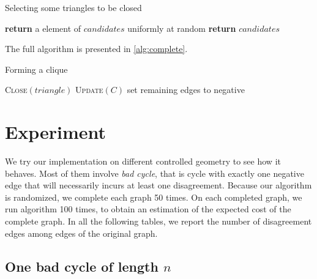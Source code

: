 \begin{algorithm}
	\caption{Selecting some triangles to be closed \label{alg:pick}}
	\begin{algorithmic}[0]
			\Else
			\EndIf
				\State \textbf{return} a element of $candidates$ uniformly at
				random 
			\Else
				\State \textbf{return} $candidates$
			\EndIf
		\EndFunction
	\end{algorithmic}
\end{algorithm}


The full algorithm is presented in \autoref{alg:complete}.

\begin{algorithm}
	\caption{Forming a clique \label{alg:complete}}
	\begin{algorithmic}[0]
			\EndIf
			\EndFor
					\State \textsc{Close}$(triangle)$
				\EndFor
				\State \textsc{Update}$(C)$
			\EndWhile
			\State set remaining edges to negative
		\EndFunction
	\end{algorithmic}
\end{algorithm}

\section{Experiment}

We try our implementation on different controlled geometry to see how it
behaves. Most of them involve \emph{bad cycle}, that is cycle with exactly one
negative edge that will necessarily incurs at least one disagreement.  Because
our algorithm is randomized, we complete each graph 50 times.  On each
completed graph, we run \ccp{} algorithm 100 times, to obtain an estimation of
the expected cost of the complete graph. In all the following tables, we
report the number of disagreement edges among edges of the original graph.

\subsection{One bad cycle of length $n$}
\label{sub:cycle}


